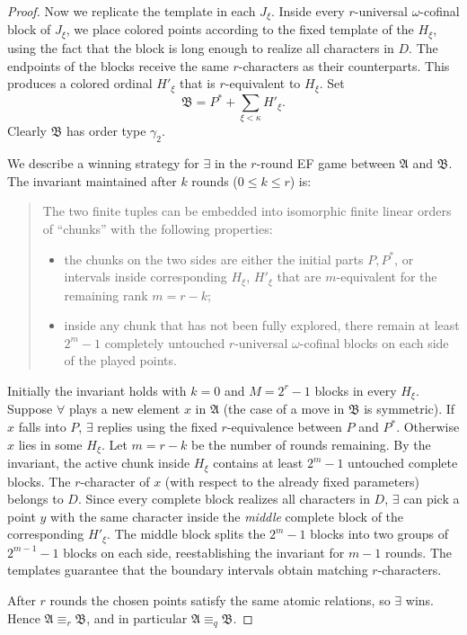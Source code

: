 \documentclass{amsart}
\theoremstyle{definition}
\begin{document}
\begin{proof}
    Now we replicate the template in each $J_\xi$. Inside every $r$-universal $\omega$-cofinal block of $J_\xi$, we place colored points according to the fixed template of the $H_\xi$, using the fact that the block is long enough to realize all characters in $D$. The endpoints of the blocks receive the same $r$-characters as their counterparts. This produces a colored ordinal $H'_\xi$ that is $r$-equivalent to $H_\xi$. Set
    $$\mathfrak{B} = P^* + \sum_{\xi<\kappa} H'_\xi.$$
    Clearly $\mathfrak{B}$ has order type $\gamma_2$.

    We describe a winning strategy for $\exists$ in the $r$-round EF game between $\mathfrak{A}$ and $\mathfrak{B}$. The invariant maintained after $k$ rounds ($0\le k\le r$) is:
    \begin{quote}
        The two finite tuples can be embedded into isomorphic finite linear orders of ``chunks'' with the following properties:
        \begin{itemize}
            \item the chunks on the two sides are either the initial parts $P,P^*$, or intervals inside corresponding $H_\xi$, $H'_\xi$ that are $m$-equivalent for the remaining rank $m = r-k$;
            \item inside any chunk that has not been fully explored, there remain at least $2^m-1$ completely untouched $r$-universal $\omega$-cofinal blocks on each side of the played points.
        \end{itemize}
    \end{quote}
    Initially the invariant holds with $k=0$ and $M=2^r-1$ blocks in every $H_\xi$. Suppose $\forall$ plays a new element $x$ in $\mathfrak{A}$ (the case of a move in $\mathfrak{B}$ is symmetric). If $x$ falls into $P$, $\exists$ replies using the fixed $r$-equivalence between $P$ and $P^*$. Otherwise $x$ lies in some $H_\xi$.  Let $m = r-k$ be the number of rounds remaining.  By the invariant, the active chunk inside $H_\xi$ contains at least $2^m-1$ untouched complete blocks.  The $r$-character of $x$ (with respect to the already fixed parameters) belongs to $D$.  Since every complete block realizes all characters in $D$, $\exists$ can pick a point $y$ with the same character inside the \emph{middle} complete block of the corresponding $H'_\xi$.  The middle block splits the $2^m-1$ blocks into two groups of $2^{m-1}-1$ blocks on each side, reestablishing the invariant for $m-1$ rounds.  The templates guarantee that the boundary intervals obtain matching $r$-characters.

    After $r$ rounds the chosen points satisfy the same atomic relations, so $\exists$ wins. Hence $\mathfrak{A}\equiv_r\mathfrak{B}$, and in particular $\mathfrak{A}\equiv_q\mathfrak{B}$.
\end{proof}
\end{document}
